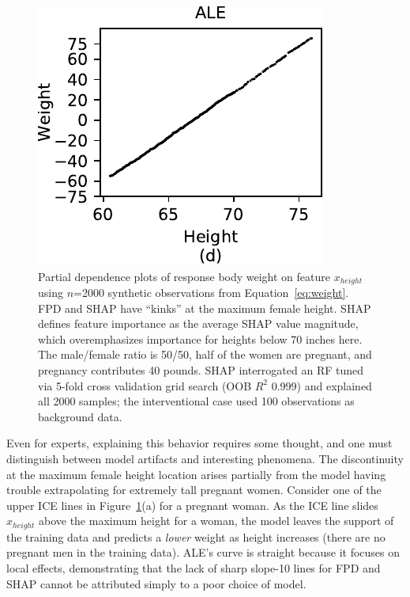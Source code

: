 \documentclass[smallextended]{svjour3}       %
\renewcommand{\eqref}[1]{Equation~\ref{#1}}
\newcommand{\figref}[1]{Figure~\ref{#1}}
\begin{document}
\begin{figure}[!htbp]
\begin{center}
\includegraphics[scale=0.46]{images/height_ale.pdf}\vspace{-2mm}
\caption{\small Partial dependence plots of response body weight on feature $x_{height}$ using $n$=2000 synthetic observations from \eqref{eq:weight}. FPD and SHAP have ``kinks'' at the maximum female height. SHAP defines feature importance as the average SHAP value magnitude, which overemphasizes importance for heights below 70 inches here. The male/female ratio is 50/50, half of the women are pregnant, and pregnancy contributes 40 pounds. SHAP interrogated an RF tuned via 5-fold cross validation grid search (OOB $R^2$ 0.999) and explained all 2000 samples; the interventional case used 100 observations as background data.}
\label{fig:heightweight}
\end{center}
\end{figure}

Even for experts, explaining this behavior requires some thought, and one must distinguish between model artifacts and interesting phenomena. The discontinuity at the maximum female height location arises partially from the model having trouble extrapolating for extremely tall pregnant women. Consider one of the upper ICE lines in \figref{fig:heightweight}(a) for a pregnant woman. As the ICE line slides $x_{height}$ above the maximum height for a woman, the model leaves the support of the training data and predicts a {\em lower} weight as height increases (there are no pregnant men in the training data). ALE's curve is straight because it focuses on local effects, demonstrating that the lack of sharp slope-10 lines for FPD and SHAP cannot be attributed simply to a poor choice of model.  
\end{document}
